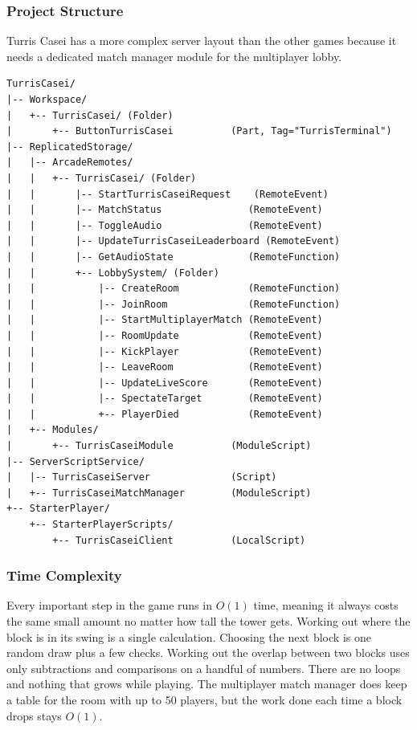 \documentclass[12pt,letterpaper]{article}
\begin{document}
\subsubsection{Project Structure}

Turris Casei has a more complex server layout than the other games because it needs a dedicated match manager module for the multiplayer lobby.

\begin{lstlisting}
TurrisCasei/
|-- Workspace/
|   +-- TurrisCasei/ (Folder)
|       +-- ButtonTurrisCasei          (Part, Tag="TurrisTerminal")
|-- ReplicatedStorage/
|   |-- ArcadeRemotes/
|   |   +-- TurrisCasei/ (Folder)
|   |       |-- StartTurrisCaseiRequest    (RemoteEvent)
|   |       |-- MatchStatus               (RemoteEvent)
|   |       |-- ToggleAudio               (RemoteEvent)
|   |       |-- UpdateTurrisCaseiLeaderboard (RemoteEvent)
|   |       |-- GetAudioState             (RemoteFunction)
|   |       +-- LobbySystem/ (Folder)
|   |           |-- CreateRoom            (RemoteFunction)
|   |           |-- JoinRoom              (RemoteFunction)
|   |           |-- StartMultiplayerMatch (RemoteEvent)
|   |           |-- RoomUpdate            (RemoteEvent)
|   |           |-- KickPlayer            (RemoteEvent)
|   |           |-- LeaveRoom             (RemoteEvent)
|   |           |-- UpdateLiveScore       (RemoteEvent)
|   |           |-- SpectateTarget        (RemoteEvent)
|   |           +-- PlayerDied            (RemoteEvent)
|   +-- Modules/
|       +-- TurrisCaseiModule          (ModuleScript)
|-- ServerScriptService/
|   |-- TurrisCaseiServer              (Script)
|   +-- TurrisCaseiMatchManager        (ModuleScript)
+-- StarterPlayer/
    +-- StarterPlayerScripts/
        +-- TurrisCaseiClient          (LocalScript)
\end{lstlisting}

\subsubsection{Time Complexity}

Every important step in the game runs in $O(1)$ time, meaning it always costs the same small amount no matter how tall the tower gets. Working out where the block is in its swing is a single calculation. Choosing the next block is one random draw plus a few checks. Working out the overlap between two blocks uses only subtractions and comparisons on a handful of numbers. There are no loops and nothing that grows while playing. The multiplayer match manager does keep a table for the room with up to 50 players, but the work done each time a block drops stays $O(1)$.
\end{document}
